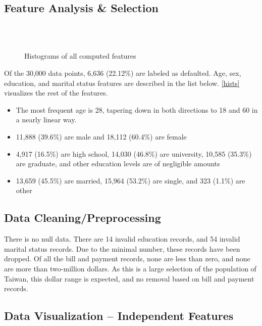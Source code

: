 \documentclass[conference]{IEEEtran}
\begin{document}
\subsection{Feature Analysis \& Selection}

\begin{figure}[ht]
	\\
	\\
	\caption{Histograms of all computed features}
	\label{hists_computed}
\end{figure}

Of the 30,000 data points, 6,636 (22.12\%) are labeled as defaulted. Age, sex,
education, and marital status features are described in the list below.
\autoref{hists} visualizes the rest of the features.

\begin{itemize}
	\item The most frequent age is 28, tapering down in both directions to 18 and 60 in a
	      nearly linear way.
	\item 11,888 (39.6\%) are male and 18,112 (60.4\%) are female
	\item 4,917 (16.5\%) are high school, 14,030 (46.8\%) are university, 10,585 (35.3\%) are graduate, and other education levels are of negligible amounts
	\item 13,659 (45.5\%) are married, 15,964 (53.2\%) are single, and 323 (1.1\%) are other
\end{itemize}

\subsection{Data Cleaning/Preprocessing}

There is no null data. There are 14 invalid education records, and 54 invalid
marital status records. Due to the minimal number, these records have been
dropped. Of all the bill and payment records, none are less than zero, and none
are more than two-million dollars. As this is a large selection of the
population of Taiwan, this dollar range is expected, and no removal based on
bill and payment records. \clearpage

\subsection{Data Visualization – Independent Features}
\end{document}
